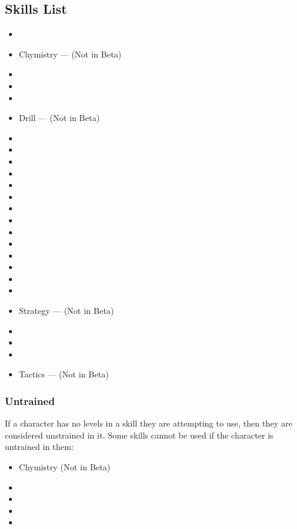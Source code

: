 \documentclass[oneside,11pt,english]{book}
\begin{document}
\subsection{Skills List}
\begin{itemize}
  [noitemsep]
\item {}
\item Chymistry --- (Not in Beta)
\item {}
\item {}
\item {}
\item Drill --- (Not in Beta)
\item {}
\item {}
\item {}
\item {}
\item {}
\item {}
\item {}
\item {}
\item {}
\item {}
\item {}
\item {}
\item {}
\item {}
\item Strategy --- (Not in Beta)
\item {}
\item {}
\item {}
\item Tactics --- (Not in Beta)
\end{itemize}

\subsubsection{Untrained}\label{par:Untrained}
If a character has no levels in a skill they are attempting to use, then they are considered unstrained in it. Some skills cannot be used if the character is untrained in them:
\begin{itemize}
  [noitemsep]
\item Chymistry (Not in Beta)
\item {}
\item {}
\item {}
\item {}
\end{itemize}
\end{document}
